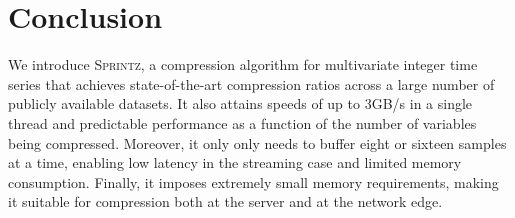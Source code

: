 \documentclass[acmlarge]{acmart}
\newcommand{\mine}{\textsc{Sprintz}}
\newcommand{\minesp}{\textsc{Sprintz}\text{ }}
\newcommand{\fire}{\textsc{Fire}\text{ }}
\begin{document}
\section{Conclusion} \label{sec:conclusion}

We introduce \mine, a compression algorithm for multivariate integer time series that achieves state-of-the-art compression ratios across a large number of publicly available datasets. It also attains speeds of up to 3GB/s in a single thread and predictable performance as a function of the number of variables being compressed. Moreover, it only only needs to buffer eight or sixteen samples at a time, enabling low latency in the streaming case and limited memory consumption. Finally, it imposes extremely small memory requirements, making it suitable for compression both at the server and at the network edge. %




% 




% 



\balance
\end{document}
